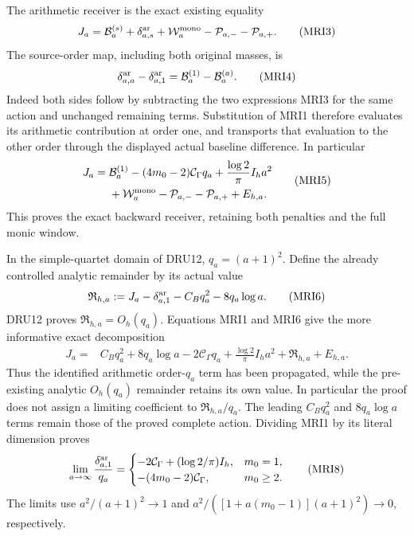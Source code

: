 \documentclass[11pt,a4paper]{article}
\begin{document}
The arithmetic receiver is the exact existing equality
\[
 J_a=\mathcal B_a^{(s)}+\delta_{a,s}^{\rm ar}
               +\mathcal W_a^{\rm mono}-\mathcal P_{a,-}-\mathcal P_{a,+}.
 \tag{MRI3}
\]
The source-order map, including both original masses, is
\[
 \delta_{a,a}^{\rm ar}-\delta_{a,1}^{\rm ar}
     =\mathcal B_a^{(1)}-\mathcal B_a^{(a)}.
 \tag{MRI4}
\]
Indeed both sides follow by subtracting the two expressions MRI3 for
the same action and unchanged remaining terms. Substitution of MRI1
therefore evaluates its arithmetic contribution at order one, and
transports that evaluation to the other order through the displayed
actual baseline difference. In particular
\[
 \begin{split}
 J_a={}&\mathcal B_a^{(1)}-(4m_0-2)\mathcal C_\Gamma q_a
       +\frac{\log2}{\pi}I_h a^2\\
      &+\mathcal W_a^{\rm mono}-\mathcal P_{a,-}-\mathcal P_{a,+}+E_{h,a}.
 \end{split}\tag{MRI5}
\]
This proves the exact backward receiver, retaining both penalties and
the full monic window.

In the simple-quartet domain of DRU12, $q_a=(a+1)^2$. Define the
already controlled analytic remainder by its actual value
\[
 \mathfrak R_{h,a}:=J_a-\delta_{a,1}^{\rm ar}
                          -C_Bq_a^2-8q_a\log a.
 \tag{MRI6}
\]
DRU12 proves $\mathfrak R_{h,a}=O_h(q_a)$. Equations MRI1 and MRI6
give the more informative exact decomposition
\[
 \begin{split}
 J_a={}&C_Bq_a^2+8q_a\log a-2\mathcal C_\Gamma q_a
        +\frac{\log2}{\pi}I_h a^2+\mathfrak R_{h,a}+E_{h,a}.
 \end{split}\tag{MRI7}
\]
Thus the identified arithmetic order-$q_a$ term has been propagated,
while the pre-existing analytic $O_h(q_a)$ remainder retains its
own value. In particular the proof does not assign a limiting
coefficient to $\mathfrak R_{h,a}/q_a$. The leading $C_Bq_a^2$ and
$8q_a\log a$ terms remain those of the proved complete action.
Dividing MRI1 by its literal dimension proves
\[
 \lim_{a\to\infty}\frac{\delta_{a,1}^{\rm ar}}{q_a}
 =\begin{cases}
 -2\mathcal C_\Gamma+(\log2/\pi)I_h,&m_0=1,\\
 -(4m_0-2)\mathcal C_\Gamma,&m_0\ge2.
 \end{cases}\tag{MRI8}
\]
The limits use $a^2/(a+1)^2\to1$ and
$a^2/([1+a(m_0-1)](a+1)^2)\to0$, respectively.
\end{document}

